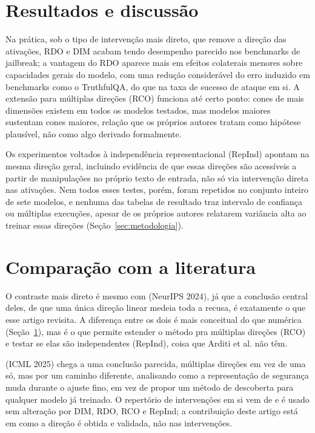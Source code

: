 \documentclass[article,11pt,oneside,a4paper,brazil,section=TITLE]{setup/abntex2}
\begin{document}
\section{Resultados e discussão}
\label{sec:resultados}

Na prática, sob o tipo de intervenção mais direto, que remove a direção das ativações, RDO e DIM acabam tendo desempenho parecido nos benchmarks de jailbreak; a vantagem do RDO aparece mais em efeitos colaterais menores sobre capacidades gerais do modelo, com uma redução considerável do erro induzido em benchmarks como o TruthfulQA, do que na taxa de sucesso de ataque em si. A extensão para múltiplas direções (RCO) funciona até certo ponto: cones de mais dimensões existem em todos os modelos testados, mas modelos maiores sustentam cones maiores, relação que os próprios autores tratam como hipótese plausível, não como algo derivado formalmente.

Os experimentos voltados à independência representacional (RepInd) apontam na mesma direção geral, incluindo evidência de que essas direções são acessíveis a partir de manipulações no próprio texto de entrada, não só via intervenção direta nas ativações. Nem todos esses testes, porém, foram repetidos no conjunto inteiro de sete modelos, e nenhuma das tabelas de resultado traz intervalo de confiança ou múltiplas execuções, apesar de os próprios autores relatarem variância alta ao treinar essas direções (Seção~\ref{sec:metodologia}).

\section{Comparação com a literatura}
\label{sec:comparacao}

O contraste mais direto é mesmo com \textcite{arditi2024refusal} (NeurIPS 2024), já que a conclusão central deles, de que uma única direção linear medeia toda a recusa, é exatamente o que esse artigo revisita. A diferença entre os dois é mais conceitual do que numérica (Seção~\ref{sec:resultados}), mas é o que permite estender o método pra múltiplas direções (RCO) e testar se elas são independentes (RepInd), coisa que Arditi et al. não têm.

\textcite{pan2025hidden} (ICML 2025) chega a uma conclusão parecida, múltiplas direções em vez de uma só, mas por um caminho diferente, analisando como a representação de segurança muda durante o ajuste fino, em vez de propor um método de descoberta para qualquer modelo já treinado. O repertório de intervenções em si vem de \textcite{zou2023representation} e é usado sem alteração por DIM, RDO, RCO e RepInd; a contribuição deste artigo está em como a direção é obtida e validada, não nas intervenções.
\end{document}
